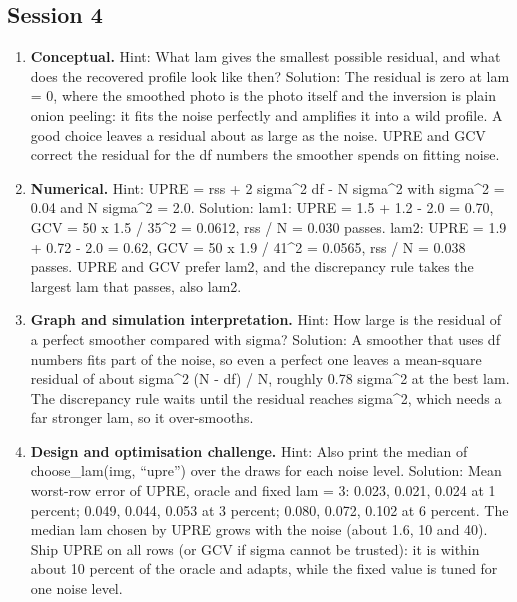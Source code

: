 \documentclass[11pt,a4paper]{article}
\begin{document}
\subsection*{Session 4}
\begin{enumerate}[nosep]
\item \textbf{Conceptual.} Hint: What lam gives the smallest possible residual, and what does the recovered profile look like then? Solution: The residual is zero at lam = 0, where the smoothed photo is the photo itself and the inversion is plain onion peeling: it fits the noise perfectly and amplifies it into a wild profile. A good choice leaves a residual about as large as the noise. UPRE and GCV correct the residual for the df numbers the smoother spends on fitting noise.
\item \textbf{Numerical.} Hint: UPRE = rss + 2 sigma\textasciicircum{}2 df - N sigma\textasciicircum{}2 with sigma\textasciicircum{}2 = 0.04 and N sigma\textasciicircum{}2 = 2.0. Solution: lam1: UPRE = 1.5 + 1.2 - 2.0 = 0.70, GCV = 50 x 1.5 / 35\textasciicircum{}2 = 0.0612, rss / N = 0.030 passes. lam2: UPRE = 1.9 + 0.72 - 2.0 = 0.62, GCV = 50 x 1.9 / 41\textasciicircum{}2 = 0.0565, rss / N = 0.038 passes. UPRE and GCV prefer lam2, and the discrepancy rule takes the largest lam that passes, also lam2.
\item \textbf{Graph and simulation interpretation.} Hint: How large is the residual of a perfect smoother compared with sigma? Solution: A smoother that uses df numbers fits part of the noise, so even a perfect one leaves a mean-square residual of about sigma\textasciicircum{}2 (N - df) / N, roughly 0.78 sigma\textasciicircum{}2 at the best lam. The discrepancy rule waits until the residual reaches sigma\textasciicircum{}2, which needs a far stronger lam, so it over-smooths.
\item \textbf{Design and optimisation challenge.} Hint: Also print the median of choose\_lam(img, ``upre'') over the draws for each noise level. Solution: Mean worst-row error of UPRE, oracle and fixed lam = 3: 0.023, 0.021, 0.024 at 1 percent; 0.049, 0.044, 0.053 at 3 percent; 0.080, 0.072, 0.102 at 6 percent. The median lam chosen by UPRE grows with the noise (about 1.6, 10 and 40). Ship UPRE on all rows (or GCV if sigma cannot be trusted): it is within about 10 percent of the oracle and adapts, while the fixed value is tuned for one noise level.
\end{enumerate}
\end{document}
